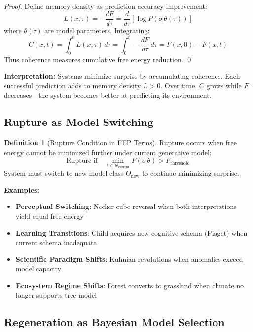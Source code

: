 \documentclass[11pt,a4paper]{article}
\theoremstyle{definition}
\newtheorem{definition}{Definition}[section]
\theoremstyle{remark}
\begin{document}
\begin{proof}
Define memory density as prediction accuracy improvement:
\begin{equation}
L(x,\tau) = -\frac{dF}{d\tau} = \frac{d}{d\tau}[\log P(o|\theta(\tau))]
\end{equation}
where $\theta(\tau)$ are model parameters. Integrating:
\begin{equation}
C(x,t) = \int_0^t L(x,\tau)\,d\tau = \int_0^t -\frac{dF}{d\tau}\,d\tau = F(x,0) - F(x,t)
\end{equation}
Thus coherence measures cumulative free energy reduction. \qed
\end{proof}

\textbf{Interpretation:} Systems minimize surprise by accumulating coherence. Each successful prediction adds to memory density $L > 0$. Over time, $C$ grows while $F$ decreases—the system becomes better at predicting its environment.

\subsection{Rupture as Model Switching}

\begin{definition}[Rupture Condition in FEP Terms]
Rupture occurs when free energy cannot be minimized further under current generative model:
\begin{equation}
\text{Rupture if} \quad \min_{\theta \in \Theta_{\text{current}}} F(o|\theta) > F_{\text{threshold}}
\label{eq:fep-rupture}
\end{equation}
System must switch to new model class $\Theta_{\text{new}}$ to continue minimizing surprise.
\end{definition}

\textbf{Examples:}
\begin{itemize}
\item \textbf{Perceptual Switching}: Necker cube reversal when both interpretations yield equal free energy
\item \textbf{Learning Transitions}: Child acquires new cognitive schema (Piaget) when current schema inadequate
\item \textbf{Scientific Paradigm Shifts}: Kuhnian revolutions when anomalies exceed model capacity
\item \textbf{Ecosystem Regime Shifts}: Forest converts to grassland when climate no longer supports tree model
\end{itemize}

\subsection{Regeneration as Bayesian Model Selection}
\end{document}
